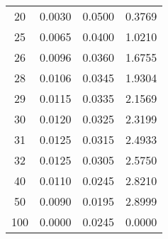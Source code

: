 \begin{table}
\begin{tabular}[t]{|cccc}
    20& 0.0030& 0.0500&  0.3769\\
    25& 0.0065& 0.0400&  1.0210\\
    26& 0.0096& 0.0360&  1.6755\\
    28& 0.0106& 0.0345& 1.9304 \\
    29& 0.0115& 0.0335& 2.1569\\
    30& 0.0120& 0.0325&  2.3199\\
    31& 0.0125& 0.0315 & 2.4933\\
    32& 0.0125& 0.0305& 2.5750\\
    40& 0.0110& 0.0245& 2.8210\\
    50& 0.0090& 0.0195& 2.8999\\
    100&0.0000& 0.0245& 0.0000\\
    \bottomrule
\end{tabular}
\label{tab:phase}
\end{table}
